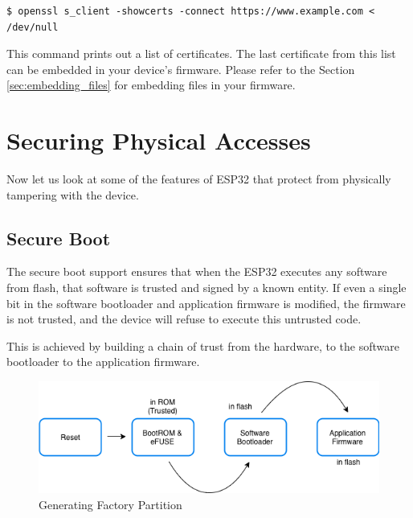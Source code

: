 \documentclass[main.tex]{subfiles}
\begin{document}
\begin{verbatim}
$ openssl s_client -showcerts -connect https://www.example.com < /dev/null
\end{verbatim}

This command prints out a list of certificates. The last certificate from this list can be embedded in your device's firmware. Please refer to the Section \ref{sec:embedding_files} for embedding files in your firmware.

\section{Securing Physical Accesses}
Now let us look at some of the features of ESP32 that protect from physically tampering with the device.

\subsection{Secure Boot}
The secure boot support ensures that when the ESP32 executes any software from flash, that software is trusted and signed by a known entity. If even a single bit in the software bootloader and application firmware is modified, the firmware is not trusted, and the device will refuse to execute this untrusted code.

This is achieved by building a chain of trust from the hardware, to the software bootloader to the application firmware.

\begin{figure}[h!]
    \centering
    \includegraphics[scale=0.5]{../../_static/secure_boot.png}
    \caption{Generating Factory Partition}
    \label{fig:gen_fac_part}
\end{figure}
\end{document}
